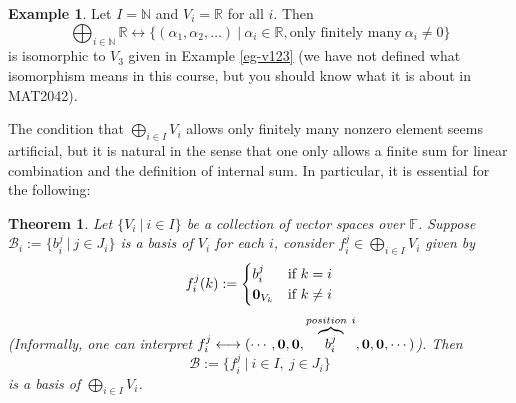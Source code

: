 \documentclass[11pt,openany]{book}
\theoremstyle{plain}
\newtheorem{theorem}{Theorem}[chapter]
\theoremstyle{definition}
\newtheorem{example}[example]{Example}
\theoremstyle{remark}
\begin{document}
\begin{example}
    Let $I = \mathbb{N}$ and $V_i = \mathbb{R}$ for all $i$. Then
    $$\bigoplus_{i \in \mathbb{N}} \mathbb{R} \longleftrightarrow \{(\alpha_1, \alpha_2, \dots)\ |\ \alpha_i \in \mathbb{R}, \text{only finitely many}\ \alpha_i \neq 0\}$$
    is isomorphic to $V_3$ given in Example \ref{eg-v123} (we have not defined what isomorphism means in this course, but you should know what it is about in MAT2042).
\end{example}

The condition that $\bigoplus_{i \in I} V_i$ allows only finitely many nonzero element seems artificial, but it is natural in the sense that one only allows a finite sum for linear combination and the definition of internal sum. In particular, it is essential for the following:
\begin{theorem}
    Let $\{V_i\ |\ i \in I\}$ be a collection of vector spaces over $\mathbb{F}$. Suppose $\mathcal{B}_i := \{b_{i}^j\ |\ j \in J_i\}$ is a basis of $V_i$ for each $i$, consider $f_{i}^j \in \bigoplus_{i \in I} V_i$ given by
    \begin{align*}
f_i^j(k) := \begin{cases} b_i^j  & \text{if}\ k = i\\ 
{\bf 0}_{V_k}  & \text{if}\ k \neq i\end{cases}
    \end{align*}
(Informally, one can interpret $f_i^j \longleftrightarrow (\cdots, {\bf 0},{\bf 0},  \overbrace{b_i^j}^{position\ i}, {\bf 0}, {\bf 0}, \cdots)$). Then
    $$\mathcal{B} := \{f_{i}^{j}\ |\ i \in I,\ j \in J_i\}$$
is a basis of $\bigoplus_{i \in I} V_i$.
\end{theorem}
\end{document}
